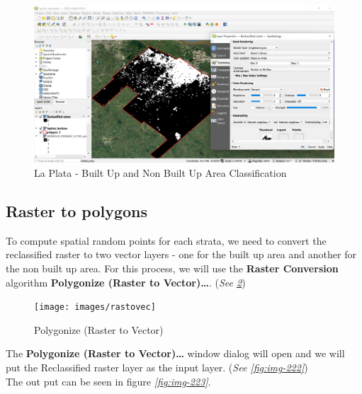 \documentclass[
]{book}
\begin{document}
\begin{figure}

{\centering \includegraphics[width=1\linewidth]{images/reclass4} 

}

\caption{La Plata - Built Up and Non Built Up Area Classification}\label{fig:img-220}
\end{figure}

\hypertarget{raster-to-polygons}{%
\subsection{Raster to polygons}\label{raster-to-polygons}}

To compute spatial random points for each strata, we need to convert the reclassified raster to two vector layers - one for the built up area and another for the non built up area. For this process, we will use the \textbf{Raster Conversion} algorithm \textbf{Polygonize (Raster to Vector)\ldots{}}. (\emph{See \ref{fig:img-221}})

\begin{figure}

{\centering \texttt{[image: images/rastovec]} 

}

\caption{Polygonize (Raster to Vector)}\label{fig:img-221}
\end{figure}

The \textbf{Polygonize (Raster to Vector)\ldots{}} window dialog will open and we will put the Reclassified raster layer as the input layer. (\emph{See \ref{fig:img-222}})\\
The out put can be seen in figure \emph{\ref{fig:img-223}}.
\end{document}

